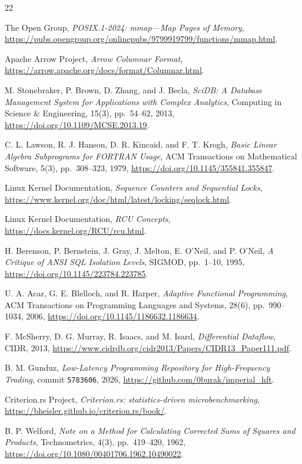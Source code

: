 \documentclass{strategynet-journal}
\begin{document}
\clearpage
\begin{thebibliography}{22}

The Open Group,
\emph{POSIX.1-2024: mmap---Map Pages of Memory},
\url{https://pubs.opengroup.org/onlinepubs/9799919799/functions/mmap.html}.

Apache Arrow Project,
\emph{Arrow Columnar Format},
\url{https://arrow.apache.org/docs/format/Columnar.html}.

M. Stonebraker, P. Brown, D. Zhang, and J. Becla,
\emph{SciDB: A Database Management System for Applications with Complex
Analytics},
Computing in Science \& Engineering, 15(3), pp.~54--62, 2013,
\url{https://doi.org/10.1109/MCSE.2013.19}.

C. L. Lawson, R. J. Hanson, D. R. Kincaid, and F. T. Krogh,
\emph{Basic Linear Algebra Subprograms for FORTRAN Usage},
ACM Transactions on Mathematical Software, 5(3), pp.~308--323, 1979,
\url{https://doi.org/10.1145/355841.355847}.

Linux Kernel Documentation,
\emph{Sequence Counters and Sequential Locks},
\url{https://www.kernel.org/doc/html/latest/locking/seqlock.html}.

Linux Kernel Documentation,
\emph{RCU Concepts},
\url{https://docs.kernel.org/RCU/rcu.html}.

H. Berenson, P. Bernstein, J. Gray, J. Melton, E. O'Neil, and P. O'Neil,
\emph{A Critique of ANSI SQL Isolation Levels},
SIGMOD, pp.~1--10, 1995,
\url{https://doi.org/10.1145/223784.223785}.

U. A. Acar, G. E. Blelloch, and R. Harper,
\emph{Adaptive Functional Programming},
ACM Transactions on Programming Languages and Systems, 28(6),
pp.~990--1034, 2006,
\url{https://doi.org/10.1145/1186632.1186634}.

F. McSherry, D. G. Murray, R. Isaacs, and M. Isard,
\emph{Differential Dataflow},
CIDR, 2013,
\url{https://www.cidrdb.org/cidr2013/Papers/CIDR13_Paper111.pdf}.

B. M. Gunduz,
\emph{Low-Latency Programming Repository for High-Frequency Trading},
commit \texttt{5783606}, 2026,
\url{https://github.com/0burak/imperial_hft}.

Criterion.rs Project,
\emph{Criterion.rs: statistics-driven microbenchmarking},
\url{https://bheisler.github.io/criterion.rs/book/}.

B. P. Welford,
\emph{Note on a Method for Calculating Corrected Sums of Squares and Products},
Technometrics, 4(3), pp.~419--420, 1962,
\url{https://doi.org/10.1080/00401706.1962.10490022}.


\end{thebibliography}
\end{document}
